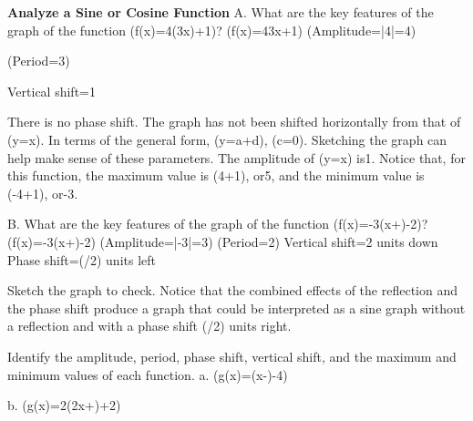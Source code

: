 \documentclass{article}
\newenvironment{example}[1]{}{}         %
\newenvironment{tryit}[1]{}{}           %
\newcommand{\answer}[1]{}               %
\newcommand{\placeholder}[2]{}          %
\newcommand{\te}[1]{}                   %
\begin{document}
\begin{example}{3}
\textbf{Analyze a Sine or Cosine Function}
A. What are the key features of the graph of the function (f(x)=4\cos(3x)+1)?
(f(x)=4\cos3x+1)
(Amplitude=|4|=4)
\te{Callout: The amplitude is the absolute value of the coefficient of cosine.}
(Period=\frac{2\pi}3)
\te{Callout: To calculate the period, divide (2\pi) by the coefficient of x.}
Vertical shift=1
\te{Callout: The graph of (y=4\cos3x) has been shifted up1 unit.}
There is no phase shift. The graph has not been shifted horizontally from that of (y=\cos x). In terms of the general form, (y=a\cos[b(x-c)]+d), (c=0).
Sketching the graph can help make sense of these parameters.
The amplitude of (y=\cos x) is1. Notice that, for this function, the maximum value is (4+1), or5, and the minimum value is (-4+1), or-3.
\placeholder{graph}{Red4cos3x+1, arrowed x,y axes,O, x ticks pi/6 labels-pi/2,pi/2; y ticks1 labels-2,2,4,window-pi..pi,-4..6. Maxima(-2pi/3,5),(0,5),(2pi/3,5), minima(-pi/3,-3),(pi/3,-3),curved end arrows.}
\te{USE APPROPRIATE TOOLS. Why is it important to identify the key features of a function, even if you intend to graph it on a calculator?}
\answer{A. Amplitude4,period(2\pi/3),vertical shift1,phase shift0,maximum5,minimum-3.}
B. What are the key features of the graph of the function (f(x)=-3\sin(x+\frac{})-2)?
(f(x)=-3\sin(x+\frac{})-2)
(Amplitude=|-3|=3)
(Period=2\pi)
Vertical shift=2 units down
Phase shift=(\pi/2) units left
\te{Callout: Since the coefficient of the sine function is negative, this graph is a reflection over the x-axis of the parent function.}
Sketch the graph to check.
Notice that the combined effects of the reflection and the phase shift produce a graph that could be interpreted as a sine graph without a reflection and with a phase shift (\pi/2) units right.
\placeholder{graph}{Red-3sin(x+pi/2)-2, arrowed x,y axes,O, x labels pi/2,pi,3pi/2,2pi,gridpi/8; y labels-6,-4,-2,2,grid1,window-pi/4..17pi/8,-7..3. Minima(0,-5),(2pi,-5), maximum(pi,1),end arrows.}
\answer{B. Amplitude3,period(2\pi),vertical shift2 down,phase shift(pi/2) left.}
\end{example}
\begin{tryit}{3}
Identify the amplitude, period, phase shift, vertical shift, and the maximum and minimum values of each function.
a. (g(x)=\sin(x-\frac{})-4)
\answer{a. amplitude:(1/2); period:(2\pi); phase shift:(pi/3) units to the right; vertical shift:4 units down; minimum value:-4.5; maximum value:-3.5}
b. (g(x)=2\cos(2x+\frac{})+2)
\answer{b. amplitude:2; period:(\pi); phase shift:(pi/8) to the left; vertical shift:2 units up; minimum value:0; maximum value:4.}
\end{tryit}
\end{document}
